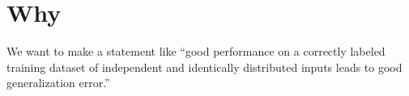 

\section*{Why}

We want to make a statement like ``good performance on a correctly labeled training dataset of independent and identically distributed inputs leads to good generalization error.''

\blankpage
